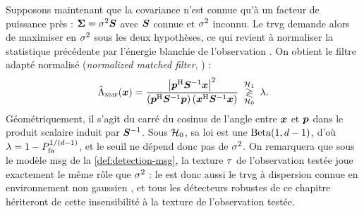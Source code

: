 Supposons maintenant que la covariance n'est connue qu'à un facteur de puissance près : $\boldsymbol{\Sigma}=\sigma^2\boldsymbol{S}$ avec $\boldsymbol{S}$ connue et $\sigma^2$ inconnu. Le trvg demande alors de maximiser en $\sigma^2$ sous les deux hypothèses, ce qui revient à normaliser la statistique précédente par l'énergie blanchie de l'observation . On obtient le filtre adapté normalisé (\emph{normalized matched filter}, ) :
\begin{equation}
  \hat{\Lambda}_{\textsc{nmf}}(\boldsymbol{x})
  =
  \frac{\left\lvert\boldsymbol{p}^{\mathrm{H}}{\boldsymbol{S}}^{-1}\boldsymbol{x}\right\rvert^2}
       {\left(\boldsymbol{p}^{\mathrm{H}}{\boldsymbol{S}}^{-1}\boldsymbol{p}\right)\left(\boldsymbol{x}^{\mathrm{H}}{\boldsymbol{S}}^{-1}\boldsymbol{x}\right)}
  \;\underset{\mathcal{H}_0}{\overset{\mathcal{H}_1}{\gtrless}}\; \lambda.
  \label{eq:detection-nmf}
\end{equation}
Géométriquement, il s'agit du carré du cosinus de l'angle entre $\boldsymbol{x}$ et $\boldsymbol{p}$ dans le produit scalaire induit par ${\boldsymbol{S}}^{-1}$. Sous $\mathcal{H}_0$, sa loi est une $\mathrm{Beta}(1,d-1)$, d'où $\lambda=1-P_{\mathrm{fa}}^{1/(d-1)}$, et le seuil ne dépend donc pas de $\sigma^2$. On remarquera que sous le modèle msg de la \cref{def:detection-msg}, la texture $\tau$ de l'observation testée joue exactement le même rôle que $\sigma^2$ : le  est donc aussi le trvg à dispersion connue en environnement non gaussien , et tous les détecteurs robustes de ce chapitre hériteront de cette insensibilité à la texture de l'observation testée.

